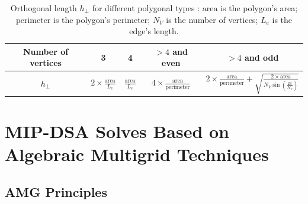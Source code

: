 \documentclass[preprint,10pt]{elsarticle}
\renewcommand{\(}{\left(}
\renewcommand{\)}{\right)}
\renewcommand{\[}{\left[}
\renewcommand{\]}{\right]}
\begin{document}
\begin{table}[H]
  \begin{center}
    \caption{Orthogonal length $h_{\bot}$ for different polygonal types : 
		$\textrm{area}$ is the polygon's area; $\textrm{perimeter}$ is the polygon's perimeter; 
		$N_V$ is the number of vertices; $L_e $ is the edge's length.}
    \begin{tabular}{|c|c|c|c|c|}
      \hline
      Number of vertices & 3 & 4 & $> 4$ and even & $> 4$ and odd \\
      \hline
      $h_{\bot}$ & $2 \times \frac{\textrm{area}}{L_e}$ &
$\frac{\textrm{area}}{L_e}$ & $4\times
\frac{\textrm{area}}{\textrm{perimeter}}$ & $2 \times
      \frac{\textrm{area}}{\textrm{perimeter}}+\sqrt{\frac{2\times
      \textrm{area}}{N_V\sin\(\frac{2\pi}{N_V}\)}}$\\
      \hline
    \end{tabular}
    \label{table_h_bot}
  \end{center}
\end{table}

\section{MIP-DSA Solves Based on Algebraic Multigrid Techniques} \label{sec_amg}

\subsection{AMG Principles}
\end{document}
